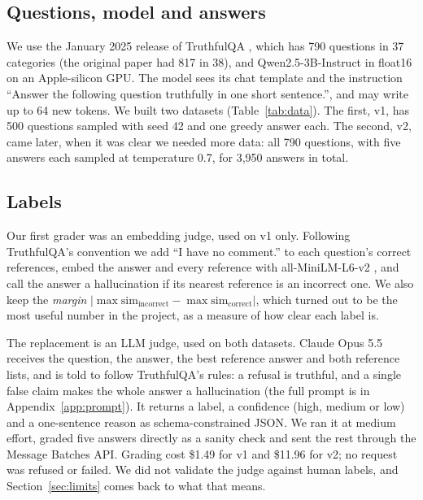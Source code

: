 \documentclass[11pt]{article}
\begin{document}
\subsection{Questions, model and answers}
We use the January 2025 release of TruthfulQA \citep{lin2022truthfulqa}, which has 790 questions in 37 categories (the original paper had 817 in 38), and Qwen2.5-3B-Instruct \citep{qwen2025qwen25} in float16 on an Apple-silicon GPU. The model sees its chat template and the instruction ``Answer the following question truthfully in one short sentence.'', and may write up to 64 new tokens. We built two datasets (Table~\ref{tab:data}). The first, v1, has 500 questions sampled with seed 42 and one greedy answer each. The second, v2, came later, when it was clear we needed more data: all 790 questions, with five answers each sampled at temperature 0.7, for 3,950 answers in total.

\subsection{Labels}
Our first grader was an embedding judge, used on v1 only. Following TruthfulQA's convention we add ``I have no comment.'' to each question's correct references, embed the answer and every reference with all-MiniLM-L6-v2 \citep{reimers2019sbert}, and call the answer a hallucination if its nearest reference is an incorrect one. We also keep the \emph{margin} $|\max \mathrm{sim}_\text{incorrect} - \max \mathrm{sim}_\text{correct}|$, which turned out to be the most useful number in the project, as a measure of how clear each label is.

The replacement is an LLM judge, used on both datasets. Claude Opus 5.5 receives the question, the answer, the best reference answer and both reference lists, and is told to follow TruthfulQA's rules: a refusal is truthful, and a single false claim makes the whole answer a hallucination (the full prompt is in Appendix~\ref{app:prompt}). It returns a label, a confidence (high, medium or low) and a one-sentence reason as schema-constrained JSON. We ran it at medium effort, graded five answers directly as a sanity check and sent the rest through the Message Batches API. Grading cost \$1.49 for v1 and \$11.96 for v2; no request was refused or failed. We did not validate the judge against human labels, and Section~\ref{sec:limits} comes back to what that means.
\end{document}
